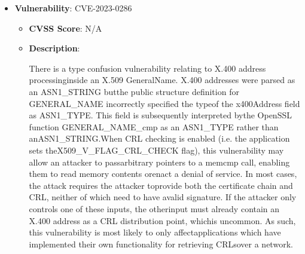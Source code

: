 \documentclass{article}
\begin{document}
\begin{itemize}
        \item \textbf{Vulnerability}: CVE-2023-0286
        \begin{itemize}
            \item \textbf{CVSS Score}:  N/A 
            \item \textbf{Description}:
            \parbox[t]{0.9\linewidth}{
                \ttfamily There is a type confusion vulnerability relating to X.400 address processinginside an X.509 GeneralName. X.400 addresses were parsed as an ASN1\_STRING butthe public structure definition for GENERAL\_NAME incorrectly specified the typeof the x400Address field as ASN1\_TYPE. This field is subsequently interpreted bythe OpenSSL function GENERAL\_NAME\_cmp as an ASN1\_TYPE rather than anASN1\_STRING.When CRL checking is enabled (i.e. the application sets theX509\_V\_FLAG\_CRL\_CHECK flag), this vulnerability may allow an attacker to passarbitrary pointers to a memcmp call, enabling them to read memory contents orenact a denial of service. In most cases, the attack requires the attacker toprovide both the certificate chain and CRL, neither of which need to have avalid signature. If the attacker only controls one of these inputs, the otherinput must already contain an X.400 address as a CRL distribution point, whichis uncommon. As such, this vulnerability is most likely to only affectapplications which have implemented their own functionality for retrieving CRLsover a network.
            }
        \end{itemize}
    

\end{itemize}
\end{document}

